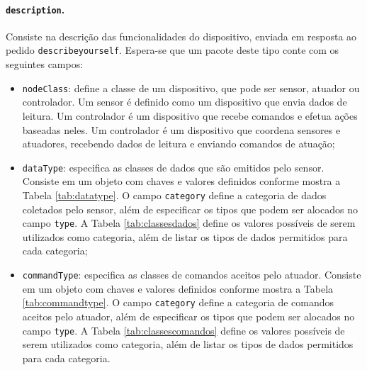 \paragraph*{\texttt{description}.} Consiste na descrição das funcionalidades do dispositivo, enviada em resposta ao pedido \texttt{describeyourself}. Espera-se que um pacote deste tipo conte com os seguintes campos:
\begin{itemize}
	\item \texttt{nodeClass}: define a classe de um dispositivo, que pode ser sensor, atuador ou controlador. Um sensor é definido como um dispositivo que envia dados de leitura. Um controlador é um dispositivo que recebe comandos e efetua ações baseadas neles. Um controlador é um dispositivo que coordena sensores e atuadores, recebendo dados de leitura e enviando comandos de atuação;
	\item \texttt{dataType}: especifica as classes de dados que são emitidos pelo sensor. Consiste em um objeto com chaves e valores definidos conforme mostra a Tabela \ref{tab:datatype}. O campo \texttt{category} define a categoria de dados coletados pelo sensor, além de especificar os tipos que podem ser alocados no campo \texttt{type}. A Tabela \ref{tab:classesdados} define os valores possíveis de serem utilizados como categoria, além de listar os tipos de dados permitidos para cada categoria;
	\item \texttt{commandType}: especifica as classes de comandos aceitos pelo atuador. Consiste em um objeto com chaves e valores definidos conforme mostra a Tabela \ref{tab:commandtype}. O campo \texttt{category} define a categoria de comandos aceitos pelo atuador, além de especificar os tipos que podem ser alocados no campo \texttt{type}. A Tabela \ref{tab:classescomandos} define os valores possíveis de serem utilizados como categoria, além de listar os tipos de dados permitidos para cada categoria.
\end{itemize}

